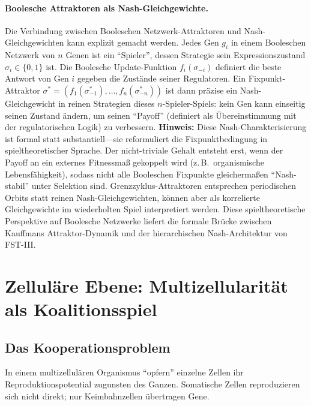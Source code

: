 \documentclass[12pt,a4paper]{article}
\theoremstyle{remark}
\begin{document}
\paragraph{Boolesche Attraktoren als Nash-Gleichgewichte.}
Die Verbindung zwischen Booleschen Netzwerk-Attraktoren und Nash-Gleichgewichten kann explizit gemacht werden. Jedes Gen $g_i$ in einem Booleschen Netzwerk von $n$ Genen ist ein ``Spieler'', dessen Strategie sein Expressionszustand $\sigma_i \in \{0, 1\}$ ist. Die Boolesche Update-Funktion $f_i(\sigma_{-i})$ definiert die beste Antwort von Gen $i$ gegeben die Zustände seiner Regulatoren. Ein Fixpunkt-Attraktor $\sigma^* = (f_1(\sigma^*_{-1}), \dots, f_n(\sigma^*_{-n}))$ ist dann präzise ein Nash-Gleichgewicht in reinen Strategien dieses $n$-Spieler-Spiels: kein Gen kann einseitig seinen Zustand ändern, um seinen ``Payoff'' (definiert als Übereinstimmung mit der regulatorischen Logik) zu verbessern. \textbf{Hinweis:} Diese Nash-Charakterisierung ist formal statt substantiell---sie reformuliert die Fixpunktbedingung in spieltheoretischer Sprache. Der nicht-triviale Gehalt entsteht erst, wenn der Payoff an ein externes Fitnessmaß gekoppelt wird (z.\,B.\ organismische Lebensfähigkeit), sodass nicht alle Booleschen Fixpunkte gleichermaßen ``Nash-stabil'' unter Selektion sind. Grenzzyklus-Attraktoren entsprechen periodischen Orbits statt reinen Nash-Gleichgewichten, können aber als korrelierte Gleichgewichte im wiederholten Spiel interpretiert werden. Diese spieltheoretische Perspektive auf Boolesche Netzwerke liefert die formale Brücke zwischen Kauffmans Attraktor-Dynamik und der hierarchischen Nash-Architektur von FST-III.

\section{Zelluläre Ebene: Multizellularität als Koalitionsspiel}
\label{sec:multicellularity}

\subsection{Das Kooperationsproblem}

In einem multizellulären Organismus ``opfern'' einzelne Zellen ihr Reproduktionspotential zugunsten des Ganzen. Somatische Zellen reproduzieren sich nicht direkt; nur Keimbahnzellen übertragen Gene.
\end{document}
